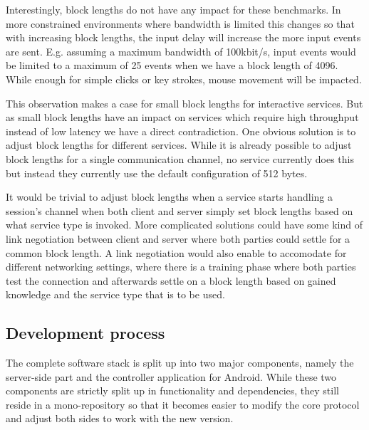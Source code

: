 Interestingly, block lengths do not have any impact for these benchmarks.
In more constrained environments where bandwidth is limited this changes so that with increasing block lengths, the input delay will increase the more input events are sent.
E.g. assuming a maximum bandwidth of 100kbit/s, input events would be limited to a maximum of 25 events when we have a block length of 4096.
While enough for simple clicks or key strokes, mouse movement will be impacted.

This observation makes a case for small block lengths for interactive services.
But as small block lengths have an impact on services which require high throughput instead of low latency we have a direct contradiction.
One obvious solution is to adjust block lengths for different services.
While it is already possible to adjust block lengths for a single communication channel, no service currently does this but instead they currently use the default configuration of 512 bytes.

It would be trivial to adjust block lengths when a service starts handling a session's channel when both client and server simply set block lengths based on what service type is invoked.
More complicated solutions could have some kind of link negotiation between client and server where both parties could settle for a common block length.
A link negotiation would also enable to accomodate for different networking settings, where there is a training phase where both parties test the connection and afterwards settle on a block length based on gained knowledge and the service type that is to be used.

\subsection{Development process}

The complete software stack is split up into two major components, namely the server-side part and the controller application for Android.
While these two components are strictly split up in functionality and dependencies, they still reside in a mono-repository so that it becomes easier to modify the core protocol and adjust both sides to work with the new version.

